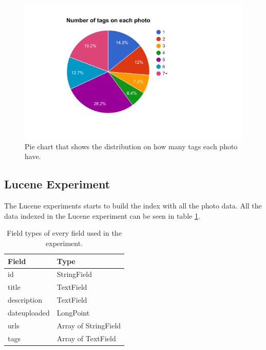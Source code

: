 \begin{figure}[h!]
  \centering \includegraphics[width=1\linewidth]{img/number-of-tags-distribution.png}
  \caption{Pie chart that shows the distribution on how many tags each photo have.}
  \label{fig:pie-chart-tag-distribution}
\end{figure}

\subsection{Lucene Experiment}
The Lucene experiments starts to build the index with all the photo data.
All the data indexed in the Lucene experiment can be seen in table \ref{tbl:lucene-field-types}.

\begin{table}[h!]
    \begin{tabular}{|l|l|}
    \hline
    \textbf{Field}& \textbf{Type}                 \\ \hline
    id           & StringField          \\ \hline
    title        & TextField            \\ \hline
    description  & TextField            \\ \hline
    dateuploaded & LongPoint            \\ \hline
    urls         & Array of StringField \\ \hline
    tags         & Array of TextField   \\ \hline
    \end{tabular}
    \centering
    \caption{Field types of every field used in the experiment.}
    \label{tbl:lucene-field-types}
\end{table}

